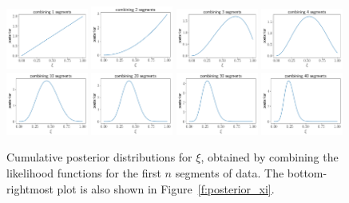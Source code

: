 %
\begin{figure}[htbp!]
\begin{center}
\includegraphics[width=0.24\textwidth]{Figures/posterior_xi_cum_0}
\includegraphics[width=0.24\textwidth]{Figures/posterior_xi_cum_1}
\includegraphics[width=0.24\textwidth]{Figures/posterior_xi_cum_2}
\includegraphics[width=0.24\textwidth]{Figures/posterior_xi_cum_3}
\includegraphics[width=0.24\textwidth]{Figures/posterior_xi_cum_9}
\includegraphics[width=0.24\textwidth]{Figures/posterior_xi_cum_19}
\includegraphics[width=0.24\textwidth]{Figures/posterior_xi_cum_29}
\includegraphics[width=0.24\textwidth]{Figures/posterior_xi_cum_39}
\caption{Cumulative posterior distributions for $\xi$, obtained by 
combining the likelihood functions for the first $n$ segments of data.
The bottom-rightmost plot is also shown in Figure~\ref{f:posterior_xi}.}
\label{f:posteriors_xi_cum}
\end{center}
\end{figure}
